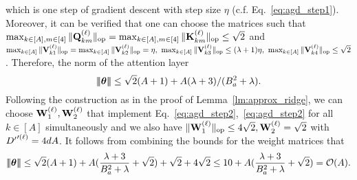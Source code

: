 which is one step of gradient descent with step size $\eta$ (c.f.   Eq.~\ref{eq:agd_step1}).  Moreover, it can be verified that one can choose the matrices such that $\max_{k\in[A],m\in[4]}\|{{\mathbf Q}_{km}^{(\ell)}}\|_{\mathrm{op}}=\max_{k\in[A],m\in[4]}\|{{\mathbf K}^{(\ell)}_{km}}\|_{\mathrm{op}}\leq\sqrt{2}$ and $\max_{k\in[A]}\|{{\mathbf V}^{(\ell)}_{k1}}\|_{\mathrm{op}}=\max_{k\in[A]}\|{{\mathbf V}^{(\ell)}_{k2}}\|_{\mathrm{op}}=\eta,~\max_{k\in[A]}\|{{\mathbf V}^{(\ell)}_{k3}}\|_{\mathrm{op}}\leq (\lambda+1)\eta,~\max_{k\in[A]}\|{{\mathbf V}^{(\ell)}_{k4}}\|_{\mathrm{op}}\leq \sqrt{2}$. Therefore, the norm of the attention layer $${\left|\!\left|\!\left|{{\boldsymbol \theta}}\right|\!\right|\!\right|}\leq \sqrt{2}(A+1)+A(\lambda+3)/(B_a^2+\lambda).$$ Following the construction as in the proof of Lemma~\ref{lm:approx_ridge}, we can choose ${\mathbf W}_1^{(\ell)},{\mathbf W}_2^{(\ell)}$ that implement Eq.~\eqref{eq:agd_step2},~\eqref{eq:agd_step2} for all $k\in[A]$ simultaneously and we also have $\|{{\mathbf W}_1^{(\ell)}}\|_{\mathrm{op}}\leq4\sqrt{2},{\mathbf W}_2^{(\ell)}=\sqrt{2}$ with ${D'}'^{{(\ell)}}=4dA$. It follows from  combining the bounds for the weight matrices that
$$
{\left|\!\left|\!\left|{{\boldsymbol \theta}}\right|\!\right|\!\right|}\leq \sqrt{2}(A+1)+A(\frac{\lambda+3}{B_a^2+\lambda}+\sqrt{2})+\sqrt{2}+4\sqrt{2}\leq 10+A(\frac{\lambda+3}{B_a^2+\lambda}+\sqrt{2})=\mathcal{O}(A).$$

